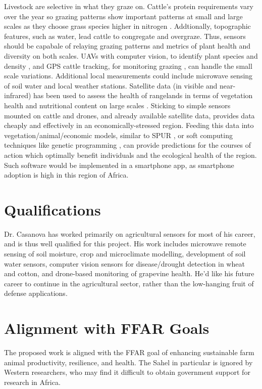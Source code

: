 \documentclass[11pt,letterpaper]{article}
\newcommand{\required}[1]{\section*{\hfil #1\hfil}}                    %
\begin{document}
Livestock are selective in what they graze on. Cattle's protein requirements vary over the year so grazing patterns show important patterns at small and large scales as they choose grass species higher in nitrogen \cite{coughenour1991spatial}. Addtionally, topographic features, such as water, lead cattle to congregate and overgraze. Thus, sensors should be capabale of relaying grazing patterns and metrics of plant health and diversity on both scales. UAVs with computer vision, to identify plant species and density \cite{rango2009unmanned}, and GPS cattle tracking, for monitoring grazing \cite{wark2007transforming}, can handle the small scale variations. Additional local measurements could include microwave sensing of soil water and local weather stations. Satellite data (in visible and near-infrared) has been used to assess the health of rangelands in terms of vegetation health and nutritional content on large scales \cite{knox2012remote}. Sticking to simple sensors mounted on cattle and drones, and already available satellite data, provides data cheaply and effectively in an economically-stressed region. Feeding this data into vegetation/animal/economic models, similar to SPUR \cite{carlson1996comprehensive}, or soft computing techniques like genetic programming \cite{traore2012regional}, can provide predictions for the courses of action which optimally benefit individuals and the ecological health of the region. Such software would be implemented in a smartphone app, as smartphone adoption is high in this region of Africa.

\required{Qualifications}
Dr. Casanova has worked primarily on agricultural sensors for most of his career, and is thus well qualified for this project. His work includes microwave remote sensing of soil moisture, crop and microclimate modelling, development of soil water sensors, computer vision sensors for disease/drought detection in wheat and cotton, and drone-based monitoring of grapevine health. He'd like his future career to continue in the agricultural sector, rather than the low-hanging fruit of defense applications.   

\required{Alignment with FFAR Goals}

The proposed work is aligned with the FFAR goal of enhancing sustainable farm animal productivity, resilience, and health. The Sahel in particular is ignored by Western researchers, who may find it difficult to obtain government support for research in Africa.


\end{document}
